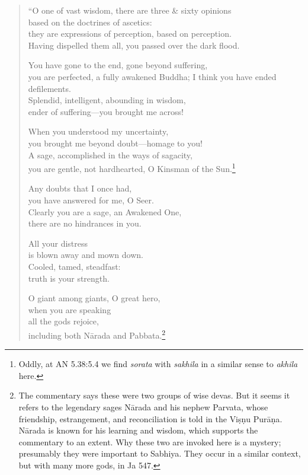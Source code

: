 \documentclass[12pt,openany]{book}%
\begin{document}
\begin{verse}%
“O one of vast wisdom, there are three \& sixty opinions \\
based on the doctrines of ascetics: \\
they are expressions of perception, based on perception. \\
Having dispelled them all, you passed over the dark flood. 

You have gone to the end, gone beyond suffering, \\
you are perfected, a fully awakened Buddha; I think you have ended defilements. \\
Splendid, intelligent, abounding in wisdom, \\
ender of suffering—you brought me across! 

When you understood my uncertainty, \\
you brought me beyond doubt—homage to you! \\
A sage, accomplished in the ways of sagacity, \\
you are gentle, not hardhearted, O Kinsman of the Sun.\footnote{Oddly, at AN 5.38:5.4 we find \textit{sorata} with \textit{sakhila} in a similar sense to \textit{akhila} here. } 

Any doubts that I once had, \\
you have answered for me, O Seer. \\
Clearly you are a sage, an Awakened One, \\
there are no hindrances in you. 

All your distress \\
is blown away and mown down. \\
Cooled, tamed, steadfast: \\
truth is your strength. 

O giant among giants, O great hero, \\
when you are speaking \\
all the gods rejoice, \\
including both \textsanskrit{Nārada} and Pabbata.\footnote{The commentary says these were two groups of wise devas. But it seems it refers to the legendary sages \textsanskrit{Nārada} and his nephew Parvata, whose friendship, estrangement, and reconciliation is told in the \textsanskrit{Viṣṇu} \textsanskrit{Purāṇa}. \textsanskrit{Nārada} is known for his learning and wisdom, which supports the commentary to an extent. Why these two are invoked here is a mystery; presumably they were important to Sabhiya. They occur in a similar context, but with many more gods, in Ja 547. } 


\end{verse}
\end{document}
